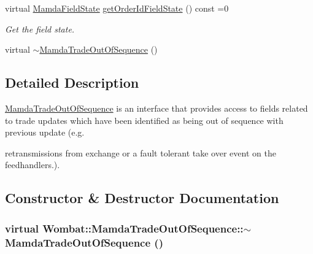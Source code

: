 \begin{CompactItemize}
virtual \hyperlink{namespaceWombat_93aac974f2ab713554fd12a1fa3b7d2a}{Mamda\-Field\-State} \hyperlink{classWombat_1_1MamdaTradeOutOfSequence_76c6f61e99d00abf4d51b943606b2517}{get\-Order\-Id\-Field\-State} () const =0
\begin{CompactList}\small\item\em Get the field state. \item\end{CompactList}\item 
virtual \hyperlink{classWombat_1_1MamdaTradeOutOfSequence_f0eb6f40cbbbe75ce70f48abe815e150}{$\sim$Mamda\-Trade\-Out\-Of\-Sequence} ()
\end{CompactItemize}


\subsection{Detailed Description}
\hyperlink{classWombat_1_1MamdaTradeOutOfSequence}{Mamda\-Trade\-Out\-Of\-Sequence} is an interface that provides access to fields related to trade updates which have been identified as being out of sequence with previous update (e.g. 

retransmissions from exchange or a fault tolerant take over event on the feedhandlers.). 



\subsection{Constructor \& Destructor Documentation}
\hypertarget{classWombat_1_1MamdaTradeOutOfSequence_f0eb6f40cbbbe75ce70f48abe815e150}{
\subsubsection[$\sim$MamdaTradeOutOfSequence]{\setlength{\rightskip}{0pt plus 5cm}virtual Wombat::Mamda\-Trade\-Out\-Of\-Sequence::$\sim$Mamda\-Trade\-Out\-Of\-Sequence ()}}
\label{classWombat_1_1MamdaTradeOutOfSequence_f0eb6f40cbbbe75ce70f48abe815e150}





